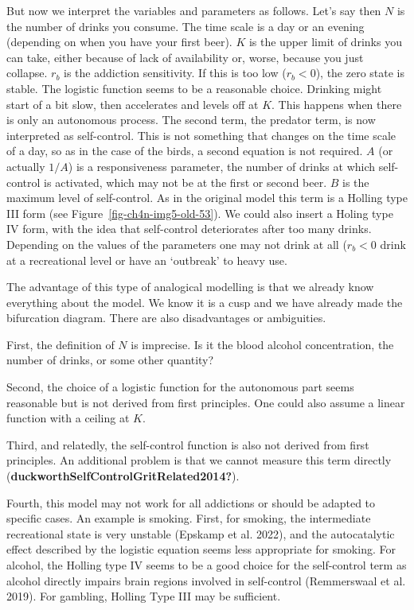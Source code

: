 \documentclass[
  a4paper,
  DIV=11,
  numbers=noendperiod]{scrreprt}
\begin{document}
But now we interpret the variables and parameters as follows. Let's say
then \(N\) is the number of drinks you consume. The time scale is a day
or an evening (depending on when you have your first beer). \(K\) is the
upper limit of drinks you can take, either because of lack of
availability or, worse, because you just collapse. \(r_{b}\) is the
addiction sensitivity. If this is too low (\(r_{b} < 0\)), the zero
state is stable. The logistic function seems to be a reasonable choice.
Drinking might start of a bit slow, then accelerates and levels off at
\(K\). This happens when there is only an autonomous process. The second
term, the predator term, is now interpreted as self-control. This is not
something that changes on the time scale of a day, so as in the case of
the birds, a second equation is not required. \(A\) (or actually
\(1/A\)) is a responsiveness parameter, the number of drinks at which
self-control is activated, which may not be at the first or second beer.
\(B\) is the maximum level of self-control. As in the original model
this term is a Holling type III form (see
Figure~\ref{fig-ch4n-img5-old-53}). We could also insert a Holing type
IV form, with the idea that self-control deteriorates after too many
drinks. Depending on the values of the parameters one may not drink at
all (\(r_{b} < 0\) drink at a recreational level or have an `outbreak'
to heavy use.

The advantage of this type of analogical modelling is that we already
know everything about the model. We know it is a cusp and we have
already made the bifurcation diagram. There are also disadvantages or
ambiguities.

First, the definition of \(N\) is imprecise. Is it the blood alcohol
concentration, the number of drinks, or some other quantity?

Second, the choice of a logistic function for the autonomous part seems
reasonable but is not derived from first principles. One could also
assume a linear function with a ceiling at \(K\).

Third, and relatedly, the self-control function is also not derived from
first principles. An additional problem is that we cannot measure this
term directly (\textbf{duckworthSelfControlGritRelated2014?}).

Fourth, this model may not work for all addictions or should be adapted
to specific cases. An example is smoking. First, for smoking, the
intermediate recreational state is very unstable (Epskamp et al. 2022),
and the autocatalytic effect described by the logistic equation seems
less appropriate for smoking. For alcohol, the Holling type IV seems to
be a good choice for the self-control term as alcohol directly impairs
brain regions involved in self-control (Remmerswaal et al. 2019). For
gambling, Holling Type III may be sufficient.
\end{document}
